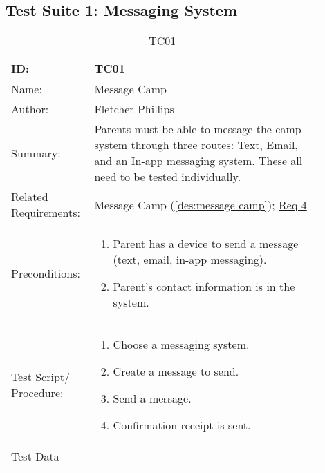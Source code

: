\documentclass[11pt]{article}
\begin{document}

\clearpage

\subsection*{Test Suite 1: Messaging System}

\begin{table}[H]
\begin{center}
\caption{TC01}
\label{TC01}
\begin{tabular}{p{0.20\linewidth}p{0.70\linewidth}}
	ID: & TC01\\\hline
	Name: & Message Camp \\\hline
	Author: & Fletcher Phillips\\\hline
	Summary: &  Parents must be able to message the camp system through three routes: Text, Email, and an In-app messaging system. These all need to be tested individually.\\\hline
	Related \hspace{5em} Requirements:& Message Camp (\cref{des:message camp}); \hyperlink{Req4}{Req 4} \\\hline
	Preconditions:& \begin{enumerate}[topsep=0pt]
		\item Parent has a device to send a message (text, email, in-app messaging).
		\item Parent's contact information is in the system.
	\end{enumerate}\\\hline
	Test Script/ Procedure: & \begin{enumerate}[topsep=0pt]
		\item Choose a messaging system.
		\item Create a message to send.
		\item Send a message.
		\item Confirmation receipt is sent.
	\end{enumerate}\\\hline
	Test Data & 
\end{tabular}
\end{center}
\end{table}
\end{document}
